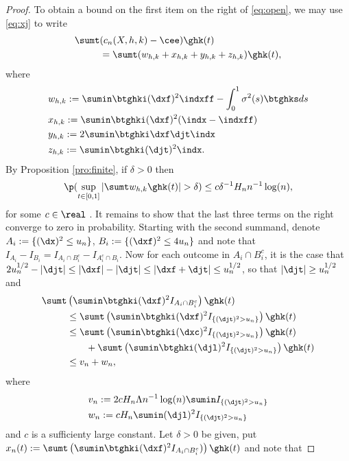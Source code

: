 \begin{proof}
     To obtain a bound on the first item on the right of \eqref{eq:open}, we may use \eqref{eq:xj} to write
    \begin{align}
      \sumt &(c_n (  X, h, k) - \cee)\ghk(t)   \notag \\&= \sumt (w_{h,k} + x_{h,k} + y_{h,k} + z_{h,k}) \ghk(t),\label{eq:summands} 
    \end{align}
    where 
    \begin{align}
      &w_{h,k} :=  \sumin \btghki  (\dxf)^2 \indxff - \int^{1}_{0} \sigma^2(s) \btghks ds \notag\\
      &x_{h,k} :=  \sumin \btghki(\dxf)^2 (\indx - \indxff) \notag\\
      &y_{h,k}  := 2 \sumin \btghki\dxf \djt \indx \notag \\
      &z_{h,k} := \sumin \btghki(\djt)^2\indx.
      \label{}
    \end{align}
    By Proposition \eqref{pro:finite}, if $\delta > 0$ then \begin{align}  \p(\sup_{t \in [0,1]}\vert \sumt w_{h,k} \ghk(t) \vert > \delta) \le  c \delta^{-1} H_nn^{-1} \log(n), \label{eq:w} \end{align} for some $c \in \real$ .  It remains to show that the last three terms on the right converge to zero in probability. Starting with the second summand, denote $A_i := \{(\dx)^2 \le u_n\}$,  $B_i   := \{(\dxf)^2 \le 4 u_n\}$ and note that $I_{A_i} - I_{B_i} = I_{A_i \cap B_i^c} - I_{A^c_i\cap B_i}$. Now for each outcome in $A_i \cap B_i^c$, it is the case that $2 u_n^{1/2} - \vert \djt \vert \le \vert \dxf \vert - \vert \djt \vert \le \vert \dxf + \djt  \vert \le u_n^{1/2}$, so that $\vert \djt \vert \ge u_n^{1/2}$ and 
    \begin{align}
      \sumt &  \left( \sumin \btghki(\dxf)^2 I_{A_i \cap B_i^c}\right) \ghk(t) \notag \\ 
       & \le \sumt \left( \sumin \btghki(\dxf)^2 I_{\{(\djt)^2 > u_n\}} \right) \ghk(t) \notag\\
       & \le \sumt \left( \sumin \btghki(\dxc)^2 I_{\{(\djt)^2 > u_n\}}\right) \ghk(t)  \notag \\ 
       &\qquad+ \sumt \left( \sumin \btghki(\djl)^2 I_{\{(\djt)^2 > u_n\}}\right) \ghk(t)\notag\\
       & \le  v_n + w_n, 
      \label{eq:longineq}
    \end{align}
    where \begin{align} &v_n :=  2c H_n \Lambda n^{-1} \log(n) \sumin I_{\{(\djt)^2 > u_n\}} \notag \\ & w_n: = c H_n \sumin  (\djl)^2 I_{\{(\djt)^2 > u_n\}}\notag \end{align}  and $c$ is a sufficienty large constant. Let  $\delta > 0$ be given, put  $x_n(t)  :=  \sumt\left(\sumin  \btghki(\dxf)^2 I_{A_i \cap B_i^c})\right)\ghk(t)$  and note that 

\end{proof}
